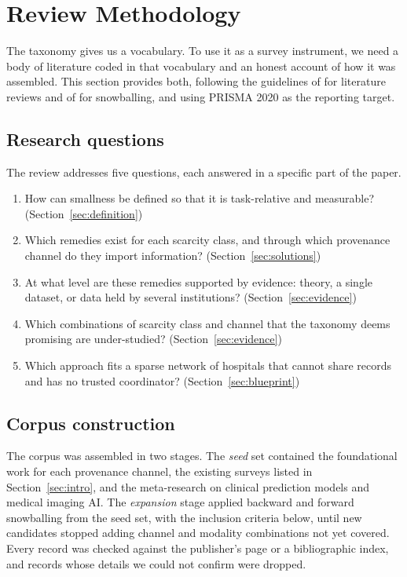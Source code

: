 \documentclass[acmsmall,screen,review]{acmart}
\theoremstyle{acmdefinition}
\begin{document}
\section{Review Methodology}\label{sec:method}

The taxonomy gives us a vocabulary. To use it as a survey instrument, we need a body of literature coded in that vocabulary and an honest account of how it was assembled. This section provides both, following the guidelines of \citet{kitchenham2007guidelines} for literature reviews and of \citet{wohlin2014guidelines} for snowballing, and using PRISMA 2020 \cite{page2021prisma} as the reporting target.

\subsection{Research questions}

The review addresses five questions, each answered in a specific part of the paper.
\begin{enumerate}[label=\textbf{RQ\arabic*},leftmargin=*,itemsep=1pt]
\item How can smallness be defined so that it is task-relative and measurable? (Section~\ref{sec:definition})
\item Which remedies exist for each scarcity class, and through which provenance channel do they import information? (Section~\ref{sec:solutions})
\item At what level are these remedies supported by evidence: theory, a single dataset, or data held by several institutions? (Section~\ref{sec:evidence})
\item Which combinations of scarcity class and channel that the taxonomy deems promising are under-studied? (Section~\ref{sec:evidence})
\item Which approach fits a sparse network of hospitals that cannot share records and has no trusted coordinator? (Section~\ref{sec:blueprint})
\end{enumerate}

\subsection{Corpus construction}

The corpus was assembled in two stages. The \emph{seed} set contained the foundational work for each provenance channel, the existing surveys listed in Section~\ref{sec:intro}, and the meta-research on clinical prediction models and medical imaging AI. The \emph{expansion} stage applied backward and forward snowballing \cite{wohlin2014guidelines} from the seed set, with the inclusion criteria below, until new candidates stopped adding channel and modality combinations not yet covered. Every record was checked against the publisher's page or a bibliographic index, and records whose details we could not confirm were dropped.
\end{document}
